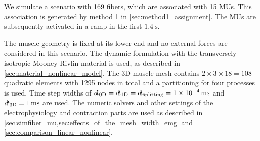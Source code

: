 We simulate a scenario with 169 fibers, which are associated with 15 MUs. This association is generated by method 1 in \cref{sec:method1_assignment}.
The MUs are subsequently activated in a ramp in the first $\SI{1.4}{\s}$. 

The muscle geometry is fixed at its lower end and no external forces are considered in this scenario. The dynamic formulation with the transversely isotropic Mooney-Rivlin material is used, as described in \cref{sec:material_nonlinear_model}.
The 3D muscle mesh contains $2 \times 3 \times 18 = 108$ quadratic elements with 1295 nodes in total and a partitioning for four processes is used. Time step widths of $\dt_\text{0D} = \dt_\text{1D} = \dt_\text{splitting} = \SI{1e-4}{\ms}$ and $\dt_\text{3D}=\SI{1}{\ms}$ are used. The numeric solvers and other settings of the electrophysiology and contraction parts are used as described in \cref{sec:simfiber_mu,sec:effects_of_the_mesh_width_emg} and \cref{sec:comparison_linear_nonlinear}.

